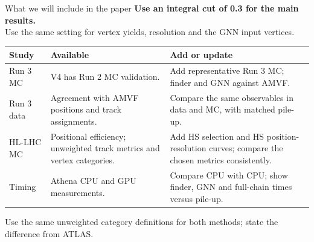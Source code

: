 \begin{frame}{What we will include in the paper}
\small
\textbf{Use an integral cut of 0.3 for the main results.}\\[.4em]
Use the same setting for vertex yields, resolution and the GNN input vertices.
\par\vspace{.6em}
\centering\footnotesize\renewcommand{\arraystretch}{1.2}
\begin{tabular}{p{2.1cm}p{4.35cm}p{6.35cm}}
\toprule
Study & Available & Add or update\\
\midrule
Run 3 MC & V4 has Run 2 MC validation. & Add representative Run 3 MC; finder and GNN against AMVF.\\
Run 3 data & Agreement with AMVF positions and track assignments. & Compare the same observables in data and MC, with matched pile-up.\\
HL-LHC MC & Positional efficiency; unweighted track metrics and vertex categories. & Add HS selection and HS position-resolution curves; compare the chosen metrics consistently.\\
Timing & Athena CPU and GPU measurements. & Compare CPU with CPU; show finder, GNN and full-chain times versus pile-up.\\
\bottomrule
\end{tabular}
\par\vspace{.5em}\raggedright\small
Use the same unweighted category definitions for both methods; state the difference from ATLAS.
\end{frame}

